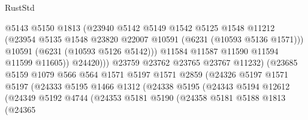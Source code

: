 \begin{lexlean}{RustStd}
\begin{coremodule}
{{                                    @5143
                                    @5150
                                    @1813
                                    (@23940
                                      @5142
                                      @5149
                                      @1542
                                      @5125
                                      @1548
                                      @11212
                                      (@23954
                                        @5135
                                        @1548
                                        @23820
                                        @22007
                                        @10591
                                        (@6231 (@10593 @5136 @1571)))
                                      @10591
                                      (@6231 (@10593 @5126 @5142)))
                                    @11584
                                    @11587
                                    @11590
                                    @11594
                                    @11599
                                    @11605))
                                @24420)))
                          @23759
                          @23762
                          @23765
                          @23767
                          @11232)
                        (@23685
                          @5159
                          @1079
                          @566
                          @564
                          @1571
                          @5197
                          @1571
                          @2859
                          (@24326
                            @5197
                            @1571
                            @5197
                            (@24333
                              @5195
                              @1466
                              @1312
                              (@24338
                                @5195
                                (@24343
                                  @5194
                                  @12612
                                  (@24349
                                    @5192
                                    @4744
                                    (@24353
                                      @5181
                                      @5190
                                      (@24358
                                        @5181
                                        @5188
                                        @1813
                                        (@24365
}}
\end{coremodule}
\end{lexlean}
